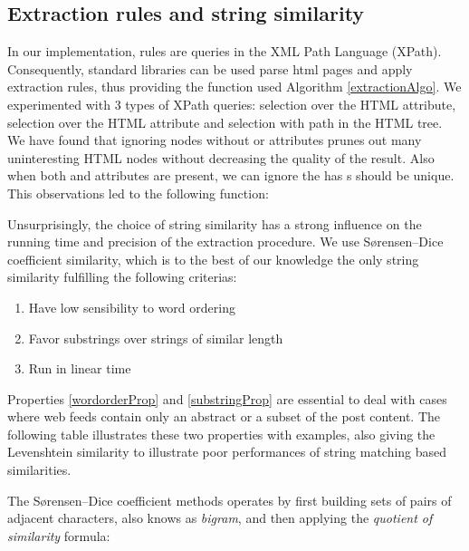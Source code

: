 \subsection{Extraction rules and string similarity}
In our implementation, rules are queries in the XML Path Language (XPath). Consequently, standard libraries can be used parse html pages and apply extraction rules, thus providing the  function used Algorithm \ref{extractionAlgo}. We experimented with 3 types of XPath queries: selection over the HTML  attribute, selection over the HTML  attribute and selection with path in the HTML tree. We have found that ignoring nodes without  or  attributes prunes out many uninteresting HTML nodes without decreasing  the quality of the result. Also when both  and  attributes are present, we can ignore the  has s should be unique. This observations led to the following  function:

\allrulesAlgo

Unsurprisingly, the choice of string similarity has a strong influence on the running time and precision of the extraction procedure. We use Sørensen–Dice coefficient similarity\cite{dice1945}, which is to the best of our knowledge the only string similarity fulfilling the following criterias:

\begin{enumerate}
  \item\label{wordorderProp} Have low sensibility to word ordering
  \item\label{substringProp} Favor substrings over strings of similar length
  \item\label{linearProp} Run in linear time
\end{enumerate}

Properties \ref{wordorderProp} and \ref{substringProp} are essential to deal with cases where web feeds contain only an abstract or a subset of the post content. The following table illustrates these two properties with examples, also giving the Levenshtein\cite{levenshtein1966} similarity to illustrate poor performances of string matching based similarities.

\similarityTable

The Sørensen–Dice coefficient methods operates by first building sets of pairs of adjacent characters, also knows as \emph{bigram}, and then applying the \emph{quotient of similarity} formula:

